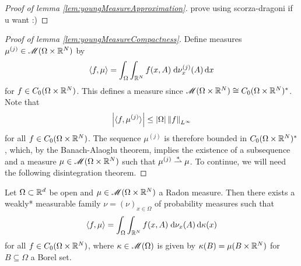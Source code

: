 \begin{proof}[Proof of lemma \ref{lem:youngMeasureApproximation}]
    {\color{red} prove using scorza-dragoni if u want :)}
\end{proof}
\begin{proof}[Proof of lemma \ref{lem:youngMeasureCompactness}] \renewcommand{\qedsymbol}{}
    Define measures $\mu^{(j)} \in \mathscr{M}(\Omega \times \mathbb{R}^N)$ by 
    \begin{equation}
        \left\langle {f,\mu} \right\rangle = \int_\Omega \int_{\mathbb{R}^N} f(x,A) \; \mathrm{d}\nu^{(j)}_x(A) \, \mathrm{d} x
    \end{equation}
    for $f \in C_0(\Omega \times \mathbb{R}^N)$. This defines a measure since $\mathscr{M}(\Omega \times \mathbb{R}^N) \cong C_0(\Omega \times \mathbb{R}^N)^*$. Note that 
    \begin{equation}
        \left\lvert {\langle {f,\mu^{(j)}} \rangle} \right\rvert \leq \left\lvert {\Omega} \right\rvert \left\lVert {f} \right\rVert_{L^\infty}
    \end{equation}
    for all $f \in C_0(\Omega \times \mathbb{R}^N)$. The sequence $\mu^{(j)}$ is therefore bounded in $C_0(\Omega \times \mathbb{R}^N)^*$, which, by the Banach-Alaoglu theorem, implies the existence of a subsequence and a measure $\mu \in \mathscr{M}(\Omega \times \mathbb{R}^N)$ such that $\mu^{(j)} \overset{\ast}{\rightharpoonup} \mu$. To continue, we will need the following disintegration theorem.
\end{proof}
\begin{theorem}
    Let $\Omega \subset \mathbb{R}^d$ be open and $\mu \in \mathscr{M}(\Omega \times \mathbb{R}^N)$ a Radon measure. Then there exists a weakly* measurable family $\nu = (\nu)_{x \in \Omega}$ of probability measures such that 
    \begin{equation}
        \left\langle {f,\mu} \right\rangle = \int_\Omega \int_{\mathbb{R}^N} f(x,A) \; \mathrm{d}\nu_x(A) \, \mathrm{d}\kappa(x)
    \end{equation}
    for all $f \in C_0(\Omega \times \mathbb{R}^N)$, where $\kappa \in \mathscr{M}(\Omega)$ is given by $\kappa(B) = \mu(B \times \mathbb{R}^N)$ for $B \subseteq \Omega$ a Borel set.
\end{theorem}
